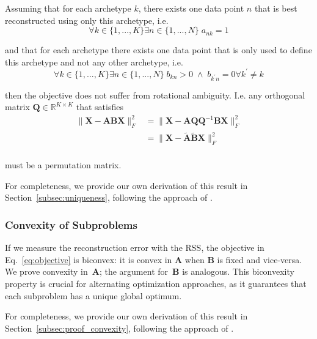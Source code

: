 \documentclass{article}
\begin{document}
Assuming that for each archetype $k$, there exists one data point $n$ that is best reconstructed using only this archetype, i.e.
\begin{equation}
    \label{eq:cond1}
    \forall k \in \{1, ..., K\} \exists n \in \{1, ..., N\} \; a_{n k} = 1
\end{equation}

and that for each archetype there exists one data point that is only used to define this archetype and not any other archetype, i.e.
\begin{equation}
    \label{eq:cond2}
    \forall k \in \{1, ..., K\} \exists n \in \{1, ..., N\} \; b_{k n} > 0 \; \land \; b_{k^\prime n} = 0 \forall k^\prime \neq k
\end{equation}

then the objective does not suffer from rotational ambiguity. I.e. any orthogonal matrix $\mathbf{Q} \in \mathbb{R}^{K \times K}$ that satisfies
\begin{equation}
    \begin{aligned}
    \| \mathbf{X} - \mathbf{A} \mathbf{B} \mathbf{X}\|_F^2
    &= \| \mathbf{X} - \mathbf{A} \mathbf{Q} \mathbf{Q}^{-1} \mathbf{B} \mathbf{X}\|_F^2 \\
    &= \| \mathbf{X} - \tilde{\mathbf{A}} \tilde{\mathbf{B}} \mathbf{X}\|_F^2 \\
    \end{aligned}
\end{equation}

must be a permutation matrix.

For completeness, we provide our own derivation of this result in Section~\ref{subsec:uniqueness}, following the approach of \textcite{morupArchetypalAnalysisMachine2012}.

\subsubsection{Convexity of Subproblems}
\label{subsubsec:convex}

If we measure the reconstruction error with the RSS, the objective in Eq.~\eqref{eq:objective} is biconvex: it is convex in $\mathbf{A}$ when $\mathbf{B}$ is fixed and vice-versa. We prove convexity in~$\mathbf{A}$; the argument for~$\mathbf{B}$ is analogous. This biconvexity property is crucial for alternating optimization approaches, as it guarantees that each subproblem has a unique global optimum.

For completeness, we provide our own derivation of this result in Section~\ref{subsec:proof_convexity}, following the approach of \textcite{morupArchetypalAnalysisMachine2012}.
\end{document}
